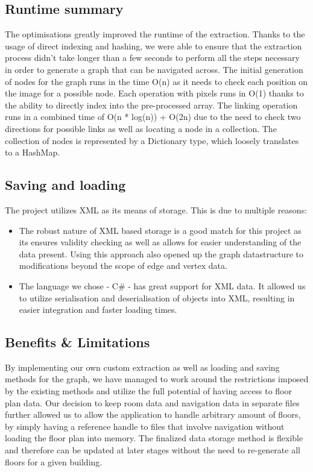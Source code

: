 \documentclass[main.tex]{subfiles}
\begin{document}
	\subsection{Runtime summary}
	The optimisations greatly improved the runtime of the extraction. Thanks to the usage of direct indexing and hashing, we were able to ensure that the extraction process didn't take longer than a few seconds to perform all the steps necessary in order to generate a graph that can be navigated across. The initial generation of nodes for the graph runs in the time O(n) as it needs to check each position on the image for a possible node. Each operation with pixels runs in O(1) thanks to the ability to directly index into the pre-processed array. The linking operation runs in a combined time of O(n * log(n)) + O(2n) due to the need to check two directions for possible links as well as locating a node in a collection. The collection of nodes is represented by a Dictionary type, which loosely translates to a HashMap. 
	\subsection{Saving and loading}
	The project utilizes XML as its means of storage. This is due to multiple reasons:
	
	\begin{itemize}
		\item The robust nature of XML based storage is a good match for this project as its ensures validity checking as well as allows for easier understanding of the data present. Using this approach also opened up the graph datastructure to modifications beyond the scope of edge and vertex data. 
		\item The language we chose - C\# - has great support for XML data. It allowed us to utilize serialisation and deserialisation of objects into XML, resulting in easier integration and faster loading times.
	\end{itemize}
	\subsection{Benefits \& Limitations}
	By implementing our own custom extraction as well as loading and saving methods for the graph, we have managed to work around the restrictions imposed by the existing methods and utilize the full potential of having access to floor plan data. Our decision to keep room data and navigation data in separate files further allowed us to allow the application to handle arbitrary amount of floors, by simply having a reference handle to files that involve navigation without loading the floor plan into memory. The finalized data storage method is flexible and therefore can be updated at later stages without the need to re-generate all floors for a given building.
\newline
\end{document}
